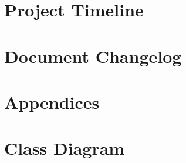 \documentclass{article}
\begin{document}
	\section{Project Timeline}
	
	\pagebreak
	
	\section{Document Changelog}
	
	\pagebreak
	
	\appendix
	\section*{Appendices}
	\section{Class Diagram}
\end{document}
